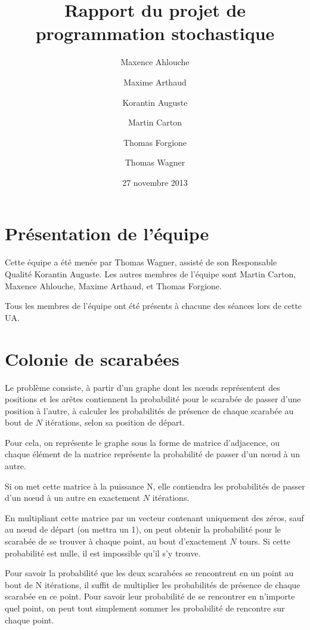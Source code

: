 \documentclass{scrartcl}
\begin{document}
\title{Rapport du projet de programmation stochastique}
\author{Maxence Ahlouche \and Maxime Arthaud \and Korantin Auguste
  \and Martin Carton \and Thomas Forgione \and Thomas Wagner}
\date{27 novembre 2013}
\maketitle
\tableofcontents
\newpage

\section{Présentation de l'équipe}
  Cette équipe a été menée par Thomas Wagner, assisté de son Responsable
  Qualité Korantin Auguste. Les autres membres de l'équipe sont Martin Carton,
  Maxence Ahlouche, Maxime Arthaud, et Thomas Forgione.

  Tous les membres de l'équipe ont été présents à chacune des séances lors de
  cette UA.

\section{Colonie de scarabées}
  Le problème consiste, à partir d'un graphe dont les nœuds représentent des
  positions et les arêtes contiennent la probabilité pour le scarabée de passer
  d'une position à l'autre, à calculer les probabilités de présence de chaque
  scarabée au bout de $N$ itérations, selon sa position de départ.

  Pour cela, on représente le graphe sous la forme de matrice d'adjacence, ou
  chaque élément de la matrice représente la probabilité de passer d'un nœud à
  un autre.

  Si on met cette matrice à la puissance N, elle contiendra les probabilités de
  passer d'un nœud à un autre en exactement $N$ itérations.

  En multipliant cette matrice par un vecteur contenant uniquement des zéros,
  sauf au nœud de départ (on mettra un 1), on peut obtenir la probabilité pour
  le scarabée de se trouver à chaque point, au bout d'exactement $N$ tours.  Si
  cette probabilité est nulle, il est impossible qu'il s'y trouve.

  Pour savoir la probabilité que les deux scarabées se rencontrent en un point
  au bout de N itérations, il suffit de multiplier les probabilités de présence
  de chaque scarabée en ce point. Pour savoir leur probabilité de se rencontrer
  en n'importe quel point, on peut tout simplement sommer les probabilité de
  rencontre sur chaque point.
\end{document}
